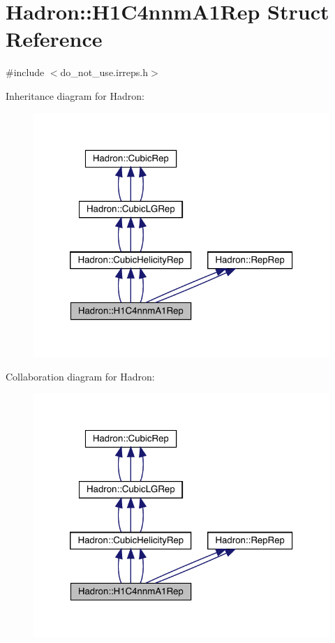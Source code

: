 \hypertarget{structHadron_1_1H1C4nnmA1Rep}{}\section{Hadron\+:\+:H1\+C4nnm\+A1\+Rep Struct Reference}
\label{structHadron_1_1H1C4nnmA1Rep}


{\ttfamily \#include $<$do\+\_\+not\+\_\+use.\+irreps.\+h$>$}



Inheritance diagram for Hadron\+:
\nopagebreak
\begin{figure}[H]
\begin{center}
\leavevmode
\includegraphics[width=320pt]{de/d8a/structHadron_1_1H1C4nnmA1Rep__inherit__graph}
\end{center}
\end{figure}


Collaboration diagram for Hadron\+:
\nopagebreak
\begin{figure}[H]
\begin{center}
\leavevmode
\includegraphics[width=320pt]{da/dd5/structHadron_1_1H1C4nnmA1Rep__coll__graph}
\end{center}
\end{figure}
